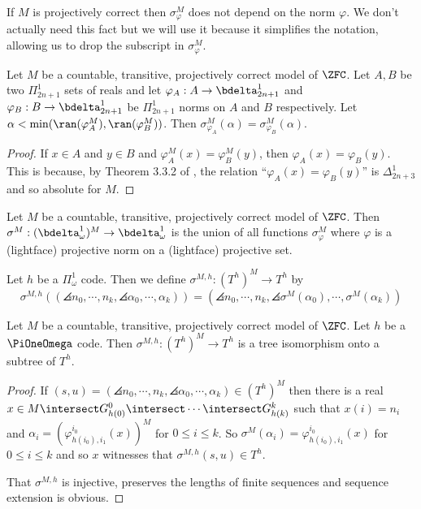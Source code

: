 \documentclass[oneside,12pt]{amsart}
\begin{document}
If $M$ is projectively correct then $\sigma^M_{\varphi}$ does not depend on the norm $\varphi$.
We don't actually need this fact but we will use it because it simplifies the
notation, allowing us to drop the subscript in $\sigma^M_{\varphi}$.

\begin{lemma}
Let $M$ be a countable, transitive, projectively correct model of $\ZFC$.
Let $A,B$ be two $\Pi^1_{2n+1}$ sets of reals and let $\varphi_A:A\to\bdelta^1_{2n+1}$
and $\varphi_B:B\to\bdelta^1_{2n+1}$ be $\Pi^1_{2n+1}$ norms on $A$ and $B$ respectively.
Let $\alpha < \min(\ran(\varphi^M_A),\ran(\varphi^M_B))$. Then
$\sigma^M_{\varphi_A}(\alpha) = \sigma^M_{\varphi_B}(\alpha)$.
\end{lemma}
\begin{proof}
If $x\in A$ and $y\in B$ and $\varphi^M_A(x) = \varphi^M_B(y)$, then
$\varphi_A(x)=\varphi_B(y)$. This is because,
by Theorem 3.3.2 of \cite{HarringtonKechris}, the relation
``$\varphi_A(x)=\varphi_B(y)$'' is $\Delta^1_{2n+3}$ and so absolute for $M$.
\end{proof}


\begin{definition}
\label{norm_embedding_def}
Let $M$ be a countable, transitive, projectively correct model of $\ZFC$.
Then $\sigma^M:(\bdelta^1_{\omega})^M\to\bdelta^1_{\omega}$ is the union of all
functions $\sigma^M_{\varphi}$ where $\varphi$ is a (lightface) projective norm on a
(lightface) projective set.

Let $h$ be a $\Pi^1_{\omega}$ code. Then we define
$\sigma^{M,h}:(T^h)^M\to T^h$ by
$$\sigma^{M,h}\left( (\angles{n_0,\cdots, n_k}, \angles{\alpha_0, \cdots, \alpha_k}  ) \right) =
(\angles{n_0,\cdots, n_k}, \angles{\sigma^M(\alpha_0), \cdots, \sigma^M(\alpha_k)}  )$$
\end{definition}

\begin{lemma}
\label{tree_embedding_lemma}
Let $M$ be a countable, transitive, projectively correct model of $\ZFC$.
Let $h$ be a $\PiOneOmega$ code.
Then $\sigma^{M,h}:(T^h)^M\to T^h$ is a tree isomorphism
onto a subtree of $T^h$.
\end{lemma}
\begin{proof}
If $(s,u) = (\angles{n_0,\cdots, n_k}, \angles{\alpha_0, \cdots, \alpha_k}  ) \in (T^h)^M$
then there is a real $x\in M \intersect G^0_{h(0)} \intersect \cdots \intersect G^k_{h(k)}$ such
that $x(i)=n_i$ and $\alpha_i=(\varphi^{i_0}_{h(i_0),i_1}(x))^M$  for $0\leq i \leq k$.
So $\sigma^M(\alpha_i) = \varphi^{i_0}_{h(i_0),i_1}(x)$ for $0\leq i \leq k$ and so
$x$ witnesses that  $\sigma^{M,h}(s,u)\in T^h$.

That $\sigma^{M,h}$ is injective, preserves the lengths of finite sequences and sequence extension
is obvious.
\end{proof}
\end{document}
